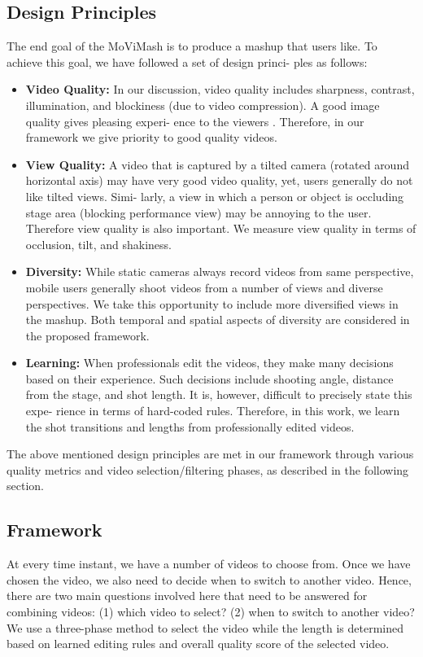 \documentclass{sig-alternate}
\providecommand{\DIFadd}[1]{{\protect\color{blue}\uwave{#1}}} %
\providecommand{\DIFaddbegin}{} %
\providecommand{\DIFaddend}{} %
\begin{document}
\subsection{Design Principles}
\DIFaddbegin \DIFadd{I am a new sentence.
}\DIFaddend The end goal of the MoViMash is to produce a mashup that users
like. To achieve this goal, we have followed a set of design princi-
ples as follows:
 \begin{itemize} 
\item \textbf{Video Quality:} In our discussion, video quality includes
sharpness, contrast, illumination, and blockiness (due to video
compression). A good image quality gives pleasing experi-
ence to the viewers \cite{salas:ten}. Therefore, in our framework we
give priority to good quality videos.
\item \textbf{View Quality:} A video that is captured by a tilted camera
(rotated around horizontal axis) may have very good video
quality, yet, users generally do not like tilted views. Simi-
larly, a view in which a person or object is occluding stage
area (blocking performance view) may be annoying to the
user. Therefore view quality is also important. We measure
view quality in terms of occlusion, tilt, and shakiness.
\item \textbf{Diversity:} While static cameras always record videos from
same perspective, mobile users generally shoot videos from
a number of views and diverse perspectives. We take this
opportunity to include more diversified views in the mashup.
Both temporal and spatial aspects of diversity are considered
in the proposed framework.
\item \textbf{Learning:} When professionals edit the videos, they make
many decisions based on their experience. Such decisions
include shooting angle, distance from the stage, and shot
length. It is, however, difficult to precisely state this expe-
rience in terms of hard-coded rules. Therefore, in this work,
we learn the shot transitions and lengths from professionally
edited videos.
 \end{itemize} 

The above mentioned design principles are met in our framework
through various quality metrics and video selection/filtering phases,
as described in the following section.

\subsection{Framework}
\DIFaddbegin \DIFadd{I am a new sentence.
}\DIFaddend At every time instant, we have a number of videos to choose
from. Once we have chosen the video, we also need to decide when
to switch to another video. Hence, there are two main questions
involved here that need to be answered for combining videos: (1)
which video to select? (2) when to switch to another video? We
use a three-phase method to select the video while the length is
determined based on learned editing rules and overall quality score
of the selected video.
\end{document}

